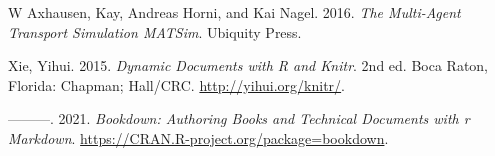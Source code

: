 \documentclass[12pt, oneside, openright]{byuthesis}
\newlength{\cslhangindent}
\newlength{\cslentryspacingunit} %
\newenvironment{CSLReferences}[2] %
 {%
  \setlength{\parindent}{0pt}
  \ifodd #1
  \let\oldpar\par
  \def\par{\hangindent=\cslhangindent\oldpar}
  \fi
  \setlength{\parskip}{#2\cslentryspacingunit}
 }%
 {}
\begin{document}
\begin{CSLReferences}{1}{0}
\leavevmode{}%
W Axhausen, Kay, Andreas Horni, and Kai Nagel. 2016. \emph{The Multi-Agent Transport Simulation MATSim}. Ubiquity Press.

\leavevmode{}%
Xie, Yihui. 2015. \emph{Dynamic Documents with {R} and Knitr}. 2nd ed. Boca Raton, Florida: Chapman; Hall/CRC. \url{http://yihui.org/knitr/}.

\leavevmode{}%
---------. 2021. \emph{Bookdown: Authoring Books and Technical Documents with r Markdown}. \url{https://CRAN.R-project.org/package=bookdown}.

\end{CSLReferences}


\end{document}
